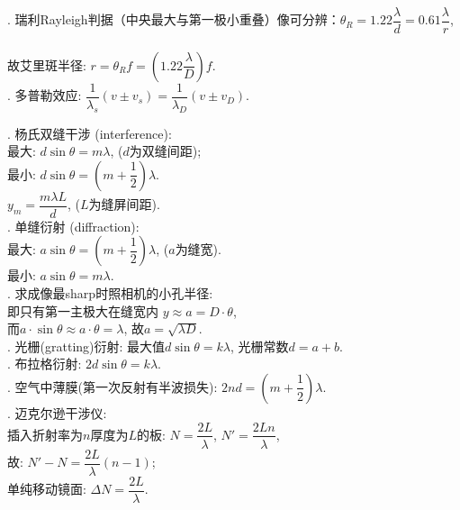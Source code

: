 \documentclass[12pt, 
]{article}
\begin{document}
. 瑞利Rayleigh判据（中央最大与第一极小重叠）像可分辨：$\theta_R=1.22\dfrac{\lambda}{d}=0.61\dfrac{\lambda}{r}$,
~\\\phantom{~~~~}故艾里斑半径: $r=\theta_R f=(1.22\dfrac{\lambda}{D})f$.
~\\

. 多普勒效应: $\dfrac{1}{\lambda_s}(v\pm v_s)=\dfrac{1}{\lambda_D}(v\pm v_D)$.
~\\

. 杨氏双缝干涉 (interference):
~\\\phantom{~~~~~~~~}最大: $d\sin\theta=m\lambda$, ($d$为双缝间距);
~\\\phantom{~~~~~~~~}最小: $d\sin\theta=(m+\dfrac{1}{2})\lambda$.
~\\\phantom{~~~~~~~~~~~~}$y_m=\dfrac{m\lambda L}{d}$, ($L$为缝屏间距).~\\

. 单缝衍射 (diffraction):
~\\\phantom{~~~~~~~~}最大: $a\sin\theta=(m+\dfrac{1}{2})\lambda$, ($a$为缝宽).
~\\\phantom{~~~~~~~~}最小: $a\sin\theta=m\lambda$. 
~\\

. 求成像最sharp时照相机的小孔半径: 
~\\\phantom{~~~~~~}即只有第一主极大在缝宽内 $y\approx a=D\cdot\theta$,
~\\\phantom{~~~~~~}而$a\cdot\sin\theta\approx a\cdot\theta=\lambda$, 故$a=\sqrt{\lambda D}$.
~\\

. 光栅(gratting)衍射: 最大值$d\sin\theta=k\lambda$, 光栅常数$d=a+b$.~\\

. 布拉格衍射: $2d\sin\theta=k\lambda$.~\\

. 空气中薄膜(第一次反射有半波损失): $2nd=(m+\dfrac{1}{2})\lambda$.~\\

.  迈克尔逊干涉仪:
~\\\phantom{~~~~~}插入折射率为$n$厚度为$L$的板:	$N=\dfrac{2L}{\lambda}$, $N'=\dfrac{2Ln}{\lambda}$,
~\\\phantom{~~~~~}故: $N'-N=\dfrac{2L}{\lambda}(n-1)$;
~\\\phantom{~~~~~}单纯移动镜面: $\Delta N=\dfrac{2L}{\lambda}$.
~\\
\end{document}
